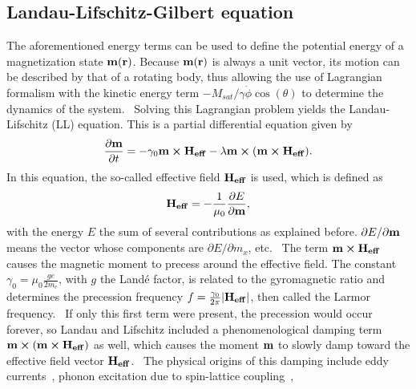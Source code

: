 \documentclass[12pt,a4paper]{article}
\begin{document}
\subsection{Landau-Lifschitz-Gilbert equation}
The aforementioned energy terms can be used to define the potential energy of a magnetization state $\vb{m}(\vb{r})$. Because $\vb{m}(\vb{r})$ is always a unit vector, its motion can be described by that of a rotating body, thus allowing the use of Lagrangian formalism with the kinetic energy term $-M_{sat}/\gamma \dot{\phi} \cos(\theta)$ to determine the dynamics of the system.~\cite{abert2013discrete} Solving this Lagrangian problem yields the Landau-Lifschitz (LL) equation. This is a partial differential equation given by~\cite{phd_leliaert}
\begin{equation}
	\frac{\partial \vb{m}}{\partial t} = - \gamma_0 \vb{m} \cross \vb{H_{eff}} - \lambda \vb{m} \cross (\vb{m} \cross \vb{H_{eff}}) \mathrm{.}
	\label{eq:LL}
\end{equation}
In this equation, the so-called effective field $\vb{H_{eff}}$ is used, which is defined as
\begin{equation}
	\vb{H_{eff}} = - \frac{1}{\mu_0} \frac{\partial E}{\partial \vb{m}} \mathrm{,}
	\label{eq:H_eff}
\end{equation}
with the energy $E$ the sum of several contributions as explained before. $\partial E/\partial \vb{m}$ means the vector whose components are $\partial E/\partial m_x$, etc.~\cite{ThermFluc_SingleDomain} 
The term $\vb{m} \cross \vb{H_{eff}}$ causes the magnetic moment to precess around the effective field. The constant $\gamma_0 = \mu_0 \frac{ge}{2m_e}$, with $g$ the Landé factor, is related to the gyromagnetic ratio and determines the precession frequency $f=\frac{\gamma_0}{2\pi}\abs{\vb{H_{eff}}}$, then called the Larmor frequency.~\cite{phd_leliaert} If only this first term were present, the precession would occur forever, so Landau and Lifschitz included a phenomenological damping term $\vb{m} \cross (\vb{m} \cross \vb{H_{eff}})$ as well, which causes the moment $\vb{m}$ to slowly damp toward the effective field vector $\vb{H_{eff}}$.~\cite{NML_Carlton} The physical origins of this damping include eddy currents~\cite{phd_leliaert}, phonon excitation due to spin-lattice coupling~\cite{phd_leliaert}, %
\end{document}
